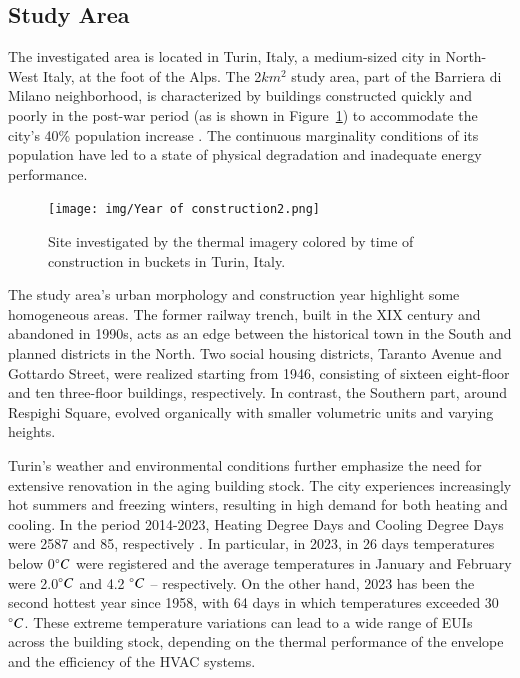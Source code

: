 \documentclass[preprint,12pt]{elsarticle}
\begin{document}
\subsection{Study Area}%
    The investigated area is located in Turin, Italy, a medium-sized city in North-West Italy, at the foot of the Alps. The 2$km^2$ study area, part of the Barriera di Milano neighborhood, is characterized by buildings constructed quickly and poorly in the post-war period (as is shown in Figure~\ref{fig:enter-label}) to accommodate the city's 40\% population increase \cite{ISTAT2024}. The continuous marginality conditions of its population have led to a state of physical degradation and inadequate energy performance.

    \begin{figure}[h!]
        \centering
        \texttt{[image: img/Year of construction2.png]}
        \caption{Site investigated by the thermal imagery colored by time of construction in buckets in Turin, Italy.}
        \label{fig:enter-label}
    \end{figure}
    
    The study area's urban morphology and construction year highlight some homogeneous areas. The former railway trench, built in the XIX century and abandoned in 1990s, acts as an edge between the historical town in the South and planned districts in the North. Two social housing districts, Taranto Avenue and Gottardo Street, were realized starting from 1946, consisting of sixteen eight-floor and ten three-floor buildings, respectively\cite{Comoli1984}. In contrast, the Southern part, around Respighi Square, evolved organically with smaller volumetric units and varying heights.

    Turin's weather and environmental conditions further emphasize the need for extensive renovation in the aging building stock. The city experiences increasingly hot summers and freezing winters, resulting in high demand for both heating and cooling. In the period 2014-2023, Heating Degree Days and Cooling Degree Days were 2587 and 85, respectively \cite{Agri4CAST}. In particular, in 2023, in 26 days temperatures below 0$\degree C$ were registered and the average temperatures in January and February were 2.0$\degree C$ and 4.2 $\degree C$ – respectively. On the other hand, 2023 has been the second hottest year since 1958, with 64 days in which temperatures exceeded 30$\degree C$. These extreme temperature variations can lead to a wide range of EUIs across the building stock, depending on the thermal performance of the envelope and the efficiency of the HVAC systems.
    
\end{document}

